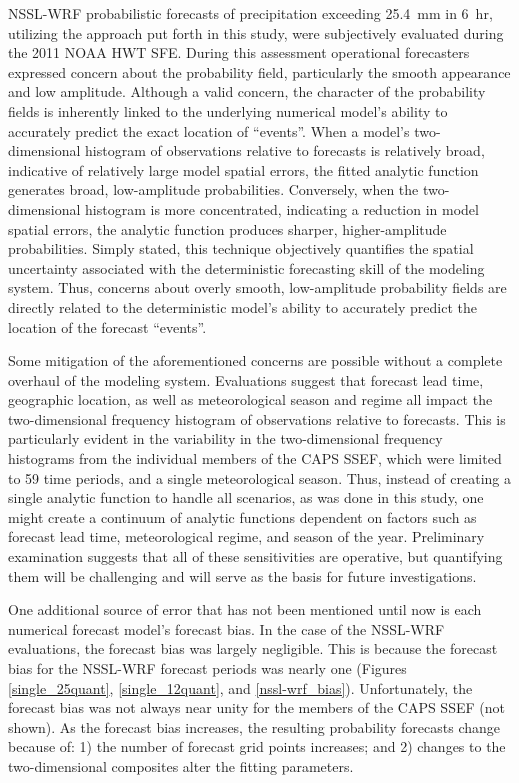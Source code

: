 NSSL-WRF probabilistic forecasts of precipitation exceeding \mbox{25.4 mm} in \mbox{6 hr}, utilizing the approach put forth in this study, were subjectively evaluated during the 2011 NOAA HWT SFE.
During this assessment operational forecasters expressed concern about the probability field, particularly the smooth appearance and low amplitude.
Although a valid concern, the character of the probability fields is inherently linked to the underlying numerical model's ability to accurately predict the exact location of ``events''.
When a model's two-dimensional histogram of observations relative to forecasts is relatively broad, indicative of relatively large model spatial errors, the fitted analytic function generates broad, low-amplitude probabilities.
Conversely, when the two-dimensional histogram is more concentrated, indicating a reduction in model spatial errors, the analytic function produces sharper, higher-amplitude probabilities.
Simply stated, this technique objectively quantifies the spatial uncertainty associated with the deterministic forecasting skill of the modeling system.
Thus, concerns about overly smooth, low-amplitude probability fields are directly related to the deterministic model's ability to accurately predict the location of the forecast ``events''.


Some mitigation of the aforementioned concerns are possible without a complete overhaul of the modeling system.
Evaluations suggest that forecast lead time, geographic location, as well as meteorological season and regime all impact the two-dimensional frequency histogram of observations relative to forecasts.
This is particularly evident in the variability in the two-dimensional frequency histograms from the individual members of the CAPS SSEF, which were limited to 59 time periods, and a single meteorological season.
Thus, instead of creating a single analytic function to handle all scenarios, as was done in this study, one might create a continuum of analytic functions dependent on factors such as forecast lead time, meteorological regime, and season of the year.
Preliminary examination suggests that all of these sensitivities are operative, but quantifying them will be challenging and will serve as the basis for future investigations.


One additional source of error that has not been mentioned until now is each numerical forecast model's forecast bias.
In the case of the NSSL-WRF evaluations, the forecast bias was largely negligible.
This is because the forecast bias for the NSSL-WRF forecast periods was nearly one (Figures \ref{single_25quant}, \ref{single_12quant}, and \ref{nssl-wrf_bias}).
Unfortunately, the forecast bias was not always near unity for the members of the CAPS SSEF (not shown).
As the forecast bias increases, the resulting probability forecasts change because of: 1) the number of forecast grid points increases; and 2) changes to the two-dimensional composites alter the fitting parameters.


